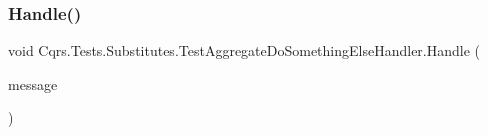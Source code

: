 \subsubsection{\texorpdfstring{Handle()}{Handle()}}
{\footnotesize\ttfamily void Cqrs.\+Tests.\+Substitutes.\+Test\+Aggregate\+Do\+Something\+Else\+Handler.\+Handle (\begin{DoxyParamCaption}\item[{\hyperlink{classCqrs_1_1Tests_1_1Substitutes_1_1TestAggregateDoSomething}{Test\+Aggregate\+Do\+Something}}]{message }\end{DoxyParamCaption})}

